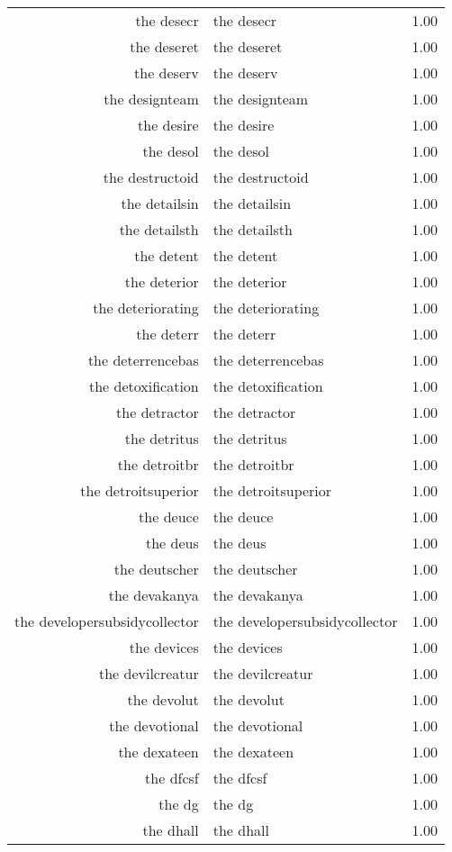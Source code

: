 \begin{table}[ht]
\begin{tabular}{rlr}
  the desecr & the desecr & 1.00 \\ 
  the deseret & the deseret & 1.00 \\ 
  the deserv & the deserv & 1.00 \\ 
  the designteam & the designteam & 1.00 \\ 
  the desire & the desire & 1.00 \\ 
  the desol & the desol & 1.00 \\ 
  the destructoid & the destructoid & 1.00 \\ 
  the detailsin & the detailsin & 1.00 \\ 
  the detailsth & the detailsth & 1.00 \\ 
  the detent & the detent & 1.00 \\ 
  the deterior & the deterior & 1.00 \\ 
  the deteriorating & the deteriorating & 1.00 \\ 
  the deterr & the deterr & 1.00 \\ 
  the deterrencebas & the deterrencebas & 1.00 \\ 
  the detoxification & the detoxification & 1.00 \\ 
  the detractor & the detractor & 1.00 \\ 
  the detritus & the detritus & 1.00 \\ 
  the detroitbr & the detroitbr & 1.00 \\ 
  the detroitsuperior & the detroitsuperior & 1.00 \\ 
  the deuce & the deuce & 1.00 \\ 
  the deus & the deus & 1.00 \\ 
  the deutscher & the deutscher & 1.00 \\ 
  the devakanya & the devakanya & 1.00 \\ 
  the developersubsidycollector & the developersubsidycollector & 1.00 \\ 
  the devices & the devices & 1.00 \\ 
  the devilcreatur & the devilcreatur & 1.00 \\ 
  the devolut & the devolut & 1.00 \\ 
  the devotional & the devotional & 1.00 \\ 
  the dexateen & the dexateen & 1.00 \\ 
  the dfcsf & the dfcsf & 1.00 \\ 
  the dg & the dg & 1.00 \\ 
  the dhall & the dhall & 1.00 \\ 

\end{tabular}
\end{table}

